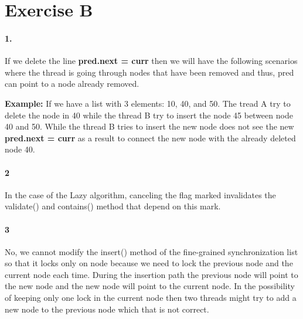 \section*{Exercise B}
\paragraph{1.}
If we delete the line \textbf{pred.next = curr} then we will have the
following scenarios where the thread is going through nodes that have
been removed and thus, pred can point to a node already removed. 

\textbf{Example:}
If we have a list with 3 elements: 10, 40, and 50. The tread A try to
delete the node in 40 while the thread B try to insert the node 45
between node 40 and 50. While the thread B tries to insert the new
node does not see the new \textbf{pred.next = curr} as a result to
connect the new node with the already deleted node 40.

\paragraph{2}
In the case of the Lazy algorithm, canceling the flag marked
invalidates the validate() and contains() method that depend on this
mark.

\paragraph{3}
No, we cannot modify the insert() method of the fine-grained
synchronization list so that it locks only on node because we need to
lock the previous node and the current node each time. During the
insertion path the previous node will point to the new node and the
new node will point to the current node. In the possibility of keeping
only one lock in the current node then two threads might try to add a
new node to the previous node which that is not correct. 
